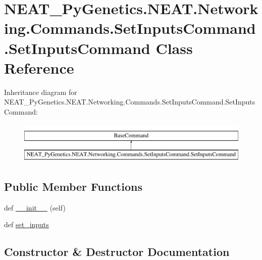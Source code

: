 \hypertarget{classNEAT__PyGenetics_1_1NEAT_1_1Networking_1_1Commands_1_1SetInputsCommand_1_1SetInputsCommand}{}\section{N\+E\+A\+T\+\_\+\+Py\+Genetics.\+N\+E\+A\+T.\+Networking.\+Commands.\+Set\+Inputs\+Command.\+Set\+Inputs\+Command Class Reference}
\label{classNEAT__PyGenetics_1_1NEAT_1_1Networking_1_1Commands_1_1SetInputsCommand_1_1SetInputsCommand}
Inheritance diagram for N\+E\+A\+T\+\_\+\+Py\+Genetics.\+N\+E\+A\+T.\+Networking.\+Commands.\+Set\+Inputs\+Command.\+Set\+Inputs\+Command\+:\begin{figure}[H]
\begin{center}
\leavevmode
\includegraphics[height=2.000000cm]{classNEAT__PyGenetics_1_1NEAT_1_1Networking_1_1Commands_1_1SetInputsCommand_1_1SetInputsCommand}
\end{center}
\end{figure}
\subsection*{Public Member Functions}
\begin{DoxyCompactItemize}
\item 
def \hyperlink{classNEAT__PyGenetics_1_1NEAT_1_1Networking_1_1Commands_1_1SetInputsCommand_1_1SetInputsCommand_a8976dadea27ff8c738c32b2a8c42acde}{\+\_\+\+\_\+init\+\_\+\+\_\+} (self)
\item 
def \hyperlink{classNEAT__PyGenetics_1_1NEAT_1_1Networking_1_1Commands_1_1SetInputsCommand_1_1SetInputsCommand_a610420d005c225778fa1be622cd3843a}{set\+\_\+inputs}
\end{DoxyCompactItemize}


\subsection{Constructor \& Destructor Documentation}
